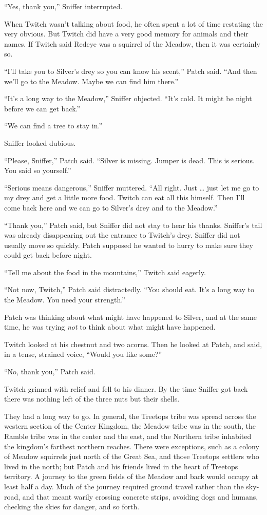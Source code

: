 \documentclass[12pt]{memoir}
\begin{document}
“Yes, thank you,” Sniffer interrupted.

When Twitch wasn’t talking about food, he often spent a lot of time
restating the very obvious. But Twitch did have a very good memory for
animals and their names. If Twitch said Redeye was a squirrel of the
Meadow, then it was certainly so.

“I’ll take you to Silver’s drey so you can know his scent,” Patch
said. “And then we’ll go to the Meadow. Maybe we can find him there.”

“It’s a long way to the Meadow,” Sniffer objected. “It’s cold. It
might be night before we can get back.”

“We can find a tree to stay in.”

Sniffer looked dubious.

“Please, Sniffer,” Patch said. “Silver is missing. Jumper is
dead. This is serious. You said so yourself.”

“Serious means dangerous,” Sniffer muttered. “All right. Just … just
let me go to my drey and get a little more food. Twitch can eat all
this himself. Then I’ll come back here and we can go to Silver’s drey
and to the Meadow.”

“Thank you,” Patch said, but Sniffer did not stay to hear his
thanks. Sniffer’s tail was already disappearing out the entrance to
Twitch’s drey. Sniffer did not usually move so quickly. Patch supposed
he wanted to hurry to make sure they could get back before night.

“Tell me about the food in the mountains,” Twitch said eagerly.

“Not now, Twitch,” Patch said distractedly. “You should eat. It’s a
long way to the Meadow. You need your strength.”

Patch was thinking about what might have happened to Silver, and at
the same time, he was trying \textit{not} to think about what might
have happened.

Twitch looked at his chestnut and two acorns. Then he looked at Patch,
and said, in a tense, strained voice, “Would you like some?”

“No, thank you,” Patch said.

Twitch grinned with relief and fell to his dinner. By the time Sniffer
got back there was nothing left of the three nuts but their shells.

They had a long way to go. In general, the Treetops tribe was spread
across the western section of the Center Kingdom, the Meadow tribe was
in the south, the Ramble tribe was in the center and the east, and the
Northern tribe inhabited the kingdom’s farthest northern
reaches. There were exceptions, such as a colony of Meadow squirrels
just north of the Great Sea, and those Treetops settlers who lived in
the north; but Patch and his friends lived in the heart of Treetops
territory. A journey to the green fields of the Meadow and back would
occupy at least half a day. Much of the journey required ground travel
rather than the sky-road, and that meant warily crossing concrete
strips, avoiding dogs and humans, checking the skies for danger, and
so forth.
\end{document}
